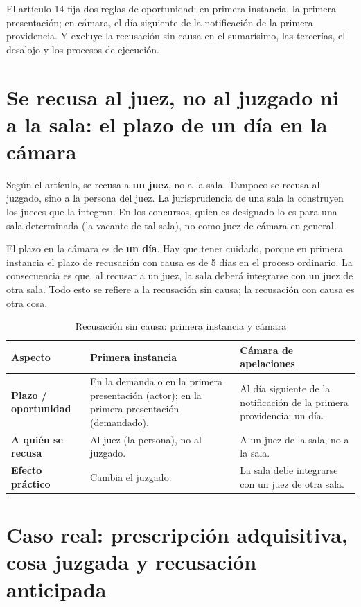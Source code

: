 \documentclass[12pt,oneside]{book}
\begin{document}
\begin{important}
El artículo 14 fija dos reglas de oportunidad: en primera instancia, la primera presentación; en cámara, el día siguiente de la notificación de la primera providencia. Y excluye la recusación sin causa en el sumarísimo, las tercerías, el desalojo y los procesos de ejecución.
\end{important}

\section{Se recusa al juez, no al juzgado ni a la sala: el plazo de un día en la cámara}

Según el artículo, se recusa a \textbf{un juez}, no a la sala. Tampoco se recusa al juzgado, sino a la persona del juez. La jurisprudencia de una sala la construyen los jueces que la integran. En los concursos, quien es designado lo es para una sala determinada (la vacante de tal sala), no como juez de cámara en general.

El plazo en la cámara es de \textbf{un día}. Hay que tener cuidado, porque en primera instancia el plazo de recusación con causa es de 5 días en el proceso ordinario. La consecuencia es que, al recusar a un juez, la sala deberá integrarse con un juez de otra sala. Todo esto se refiere a la recusación sin causa; la recusación con causa es otra cosa.

\begin{table}[H]
\centering
\caption{Recusación sin causa: primera instancia y cámara}
\small
\begin{tabularx}{\textwidth}{>{\raggedright\arraybackslash}p{3.2cm} Y Y}
\toprule
\textbf{Aspecto} & \textbf{Primera instancia} & \textbf{Cámara de apelaciones} \\
\midrule
\textbf{Plazo / oportunidad} & En la demanda o en la primera presentación (actor); en la primera presentación (demandado). & Al día siguiente de la notificación de la primera providencia: un día. \\
\textbf{A quién se recusa} & Al juez (la persona), no al juzgado. & A un juez de la sala, no a la sala. \\
\textbf{Efecto práctico} & Cambia el juzgado. & La sala debe integrarse con un juez de otra sala. \\
\bottomrule
\end{tabularx}
\end{table}

\section{Caso real: prescripción adquisitiva, cosa juzgada y recusación anticipada}
\end{document}
